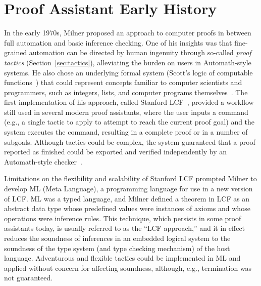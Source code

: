 \section{Proof Assistant Early History}
\label{sec:early-history}

In the early 1970s, Milner proposed an approach to computer proofs in between full automation and basic inference checking. One of his insights was that fine-grained automation can be directed by human ingenuity through so-called \emph{proof tactics} (Section~\ref{sec:tactics}), alleviating the burden on users in Automath-style systems. He also chose an underlying formal system (Scott's logic of computable functions~\citep{Scott1993}) that could represent concepts familiar to computer scientists and programmers, such as integers, lists, and computer programs themselves~\citep{Gordon2000}. The first implementation of his approach, called Stanford LCF~\citep{Milner1972b}, provided a workflow still used in several modern proof assistants, where the user inputs a command (e.g., a single tactic to apply to attempt to reach the current proof goal) and the system executes the command, resulting in a complete proof or in a number of subgoals. Although tactics could be complex, the system guaranteed that a proof reported as finished could be exported and verified independently by an Automath-style checker~\citep{Warden2009Book}.

Limitations on the flexibility and scalability of Stanford LCF prompted Milner to develop ML (Meta Language), a programming language for use in a new version of LCF. ML was a typed language, and Milner defined a theorem in LCF as an abstract data type whose predefined values were instances of axioms and whose operations were inference rules. This technique, which persists in some proof assistants today, is usually referred to as the ``LCF approach,'' and it in effect reduces the soundness of inferences in an embedded logical system to the soundness of the type system (and type checking mechanism) of the host language. Adventurous and flexible tactics could be implemented in ML and applied without concern for affecting soundness, although, e.g., termination was not guaranteed.

